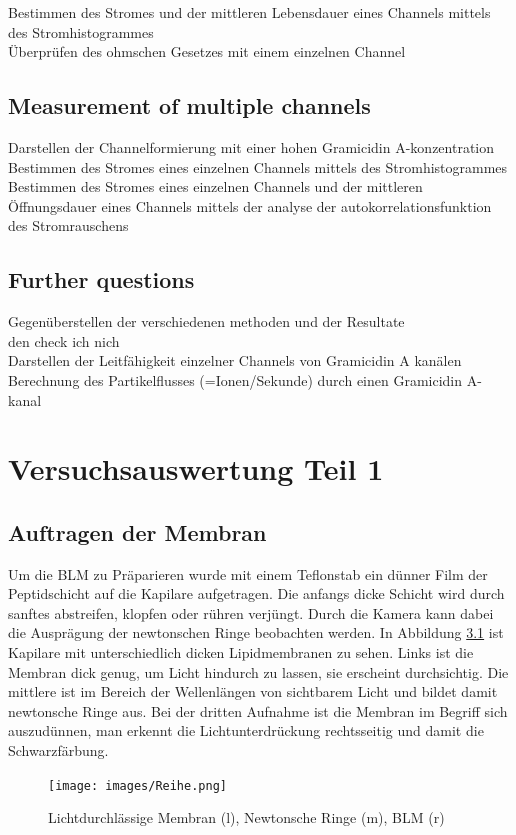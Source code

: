 \documentclass{include/thesisclass3}
\begin{document}
Bestimmen des Stromes und der mittleren Lebensdauer eines Channels mittels des Stromhistogrammes\\

Überprüfen des ohmschen Gesetzes mit einem einzelnen Channel\\

\section{Measurement of multiple channels}

Darstellen der Channelformierung mit einer hohen Gramicidin A-konzentration\\

Bestimmen des Stromes eines einzelnen Channels mittels des Stromhistogrammes\\

Bestimmen des Stromes eines einzelnen Channels und der mittleren Öffnungsdauer eines Channels mittels der analyse der autokorrelationsfunktion des Stromrauschens

\section{Further questions}

Gegenüberstellen der verschiedenen methoden und der Resultate\\

den check ich nich\\

Darstellen der Leitfähigkeit einzelner Channels von Gramicidin A kanälen\\

Berechnung des Partikelflusses (=Ionen/Sekunde) durch einen Gramicidin A-kanal



\chapter{Versuchsauswertung Teil 1}
\section{Auftragen der Membran}
Um die BLM zu Präparieren wurde mit einem Teflonstab ein dünner Film der Peptidschicht auf die Kapilare aufgetragen. Die anfangs dicke Schicht wird durch sanftes abstreifen, klopfen oder rühren verjüngt. Durch die Kamera kann dabei die Ausprägung der newtonschen Ringe beobachten werden. In Abbildung \ref{Reihe} ist Kapilare mit unterschiedlich dicken Lipidmembranen zu sehen. Links ist die Membran dick genug, um Licht hindurch zu lassen, sie erscheint durchsichtig. Die mittlere ist im Bereich der Wellenlängen von sichtbarem Licht und bildet damit newtonsche Ringe aus. Bei der dritten Aufnahme ist die Membran im Begriff sich auszudünnen, man erkennt die Lichtunterdrückung rechtsseitig und damit die Schwarzfärbung.
\begin{figure}[H]
	\begin{center}
		\texttt{[image: images/Reihe.png]}
		\caption{Lichtdurchlässige Membran (l), Newtonsche Ringe (m), BLM (r)}
		\label{Reihe}
	\end{center}
\end{figure}
\end{document}
